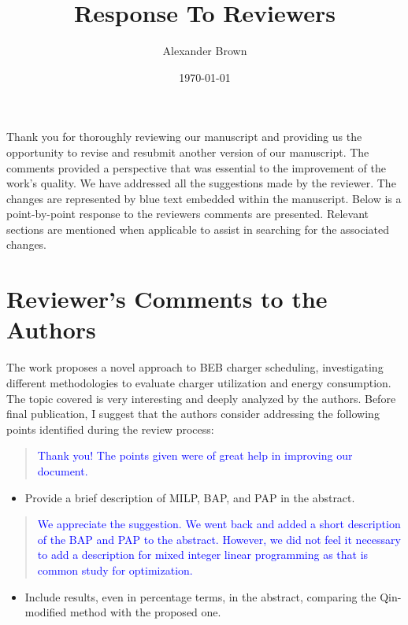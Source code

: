 \documentclass[11pt,a4paper,final]{article}
\author{Alexander Brown}
\date{\today}
\title{Response To Reviewers}
\begin{document}
\maketitle

Thank you for thoroughly reviewing our manuscript and providing us the opportunity to revise and resubmit another
version of our manuscript. The comments provided a perspective that was essential to the improvement of the work's
quality. We have addressed all the suggestions made by the reviewer. The changes are represented by blue text
embedded within the manuscript. Below is a point-by-point response to the reviewers comments are presented. Relevant
sections are mentioned when applicable to assist in searching for the associated changes.

\section{Reviewer's Comments to the Authors}
The work proposes a novel approach to BEB charger scheduling, investigating different methodologies to evaluate charger utilization and energy consumption. The topic covered is very interesting and deeply analyzed by the authors.
Before final publication, I suggest that the authors consider addressing the following points identified during the review process:

\begin{quote}
  \textcolor{blue}{Thank you! The points given were of great help in improving our document.}
\end{quote}

\begin{itemize}
  \item Provide a brief description of MILP, BAP, and PAP in the abstract.
\end{itemize}

\begin{quote}
  \textcolor{blue}{We appreciate the suggestion. We went back and added a short description of the BAP and PAP to the abstract. However, we did not feel it necessary to add a description for mixed integer linear programming as that is common study for optimization.}
\end{quote}

\begin{itemize}
\item Include results, even in percentage terms, in the abstract, comparing the Qin-modified method with the proposed one.
\end{itemize}
\end{document}
